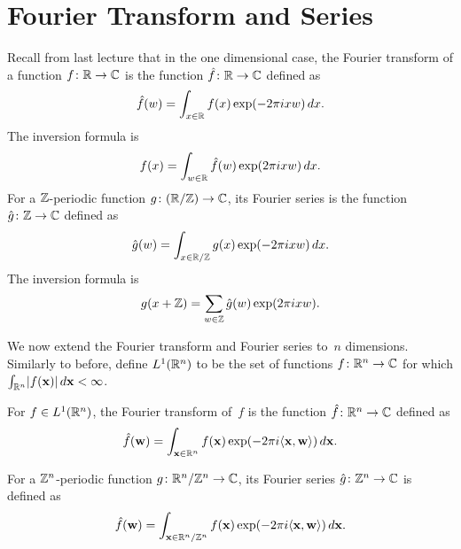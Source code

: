 \documentclass[11pt]{article}
\begin{document}
\thispagestyle{fancy} %


\section{Fourier Transform and Series}

Recall from last lecture that in the one dimensional case, the Fourier
transform of a function $f \colon \mathbb{R} \to \mathbb{C}$ is the function
$\hat{f} \colon \mathbb{R} \to \mathbb{C}$ defined as
\[ \hat{f}(w) = \int_{x\in \mathbb{R}} f(x) \exp(-2 \pi ixw) \, dx . \] The
inversion formula is
\[ f(x) = \int_{w\in \mathbb{R}} \hat{f}(w) \exp(2 \pi ixw) \, dx. \] For a
$\mathbb{Z}$-periodic function $g \colon (\mathbb{R} / \mathbb{Z}) \to \mathbb{C}$, its Fourier series
is the function $\hat{g} \colon \mathbb{Z} \to \mathbb{C}$ defined as
\[ \hat{g}(w) = \int_{x \in \mathbb{R}/\mathbb{Z}} g(x) \exp(-2 \pi ixw) \, dx . \] The
inversion formula is
\[ g(x+\mathbb{Z}) = \sum_{w \in \mathbb{Z}} \hat{g}(w) \exp(2 \pi ixw). \]

We now extend the Fourier transform and Fourier series to~$n$
dimensions. Similarly to before, define $L^{1}(\mathbb{R}^n)$ to be the set of
functions $f \colon \mathbb{R}^n \to \mathbb{C}$ for which
$\int_{\mathbb{R}^n} \lvert f(\mathbf{x})\rvert \, d\mathbf{x} < \infty$.

\begin{definition}
  \label{def:fourier-transform}
  For $f \in L^{1}(\mathbb{R}^n)$, the Fourier transform of~$f$ is the
  function $\hat{f} \colon \mathbb{R}^{n} \to \mathbb{C}$ defined as
  \[ \hat{f}(\mathbf{w}) = \int_{\mathbf{x}\in \mathbb{R}^n} f(\mathbf{x})\exp(-2 \pi i
    \langle\mathbf{x},\mathbf{w}\rangle) \, d\mathbf{x} . \]
\end{definition}

\begin{definition}
  For a $\mathbb{Z}^{n}$-periodic function $g \colon \mathbb{R}^{n}/\mathbb{Z}^{n} \to \mathbb{C}$,
  its Fourier series $\hat{g} \colon \mathbb{Z}^{n} \to \mathbb{C}$ is defined as
  \[ \hat{f}(\mathbf{w}) = \int_{\mathbf{x}\in \mathbb{R}^n / \mathbb{Z}^n} f(\mathbf{x}) \exp(-2 \pi
    i\langle\mathbf{x},\mathbf{w}\rangle) \, d\mathbf{x} . \]
\end{definition}
\end{document}
